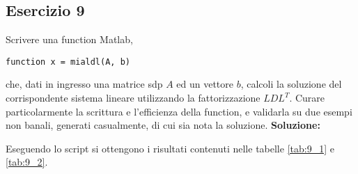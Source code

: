 \subsection{Esercizio 9}
Scrivere una function Matlab,
\begin{lstlisting}
function x = mialdl(A, b)
\end{lstlisting}
che, dati in ingresso una matrice sdp $A$ ed un vettore $b$, calcoli la soluzione
del corrispondente sistema lineare utilizzando la fattorizzazione $LDL^T$.
Curare particolarmente la scrittura e l'efficienza della function,
e validarla su due esempi non banali, generati casualmente, di cui sia nota la soluzione.
\newline \textbf{Soluzione:}


Eseguendo lo script  si ottengono i risultati contenuti nelle
tabelle \ref{tab:9_1} e \ref{tab:9_2}.

